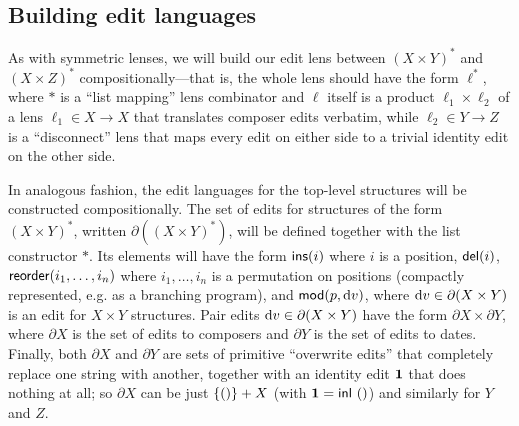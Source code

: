 \subsection{Building edit languages}
As with symmetric lenses, we will build our edit lens between $(X \times
Y)^*$ and $(X \times Z)^*$ compositionally---that is, the whole lens
should have the form $\ell^*$, where $*$ is a ``list mapping'' lens
combinator and $\ell$ itself is a product $\ell_1 \times
\ell_2$ of a lens $\ell_1 \in X \to X$ that translates composer edits
verbatim, while $\ell_2 \in Y \to Z$ is a ``disconnect'' lens that maps every edit on
either side to a trivial identity edit on the other side.

In analogous fashion, the edit languages for the top-level structures will
be constructed compositionally.  The set of edits for structures of the form
$(X \times Y)^*$, written $\partial ((X \times Y)^*)$, will be defined
together with the list constructor $*$.  Its elements will have the form
$\mathsf{ins}(i)$ where $i$ is a position, $\mathsf{del}(i)$,
$\mathsf{reorder}(i_1,\ldots,i_n)$ where $i_1,\ldots,i_n$ is a permutation on
positions (compactly represented, e.g. as a branching program),
\iflater{}\fi and $\mathsf{mod}(p,\textrm{d} v)$, where $\textrm{d} v \in
\partial (X\times Y)$ is an edit for $X \times Y$ structures.  Pair edits
$\textrm{d} v \in \partial (X \times Y)$ have the form $\partial X \times
\partial Y$, where $\partial X$ is the set of edits to composers and
$\partial Y$ is the set of edits to dates.  Finally, both $\partial
X$ and $\partial Y$ are sets of primitive ``overwrite edits'' that completely
replace one string with another, together with an identity edit $\mbox{\bf{1}}$
that does nothing at all; so $\partial X$ can be just $\{{()}\} + X$ (with
$\mbox{\bf{1}} = \mathsf{inl}\ {()}$) and similarly for $Y$ and $Z$.



